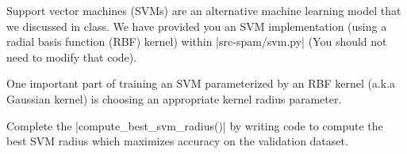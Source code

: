\item {}
Support vector machines (SVMs) are an alternative machine learning model that we discussed in class.
We have provided you an SVM implementation (using a radial basis function (RBF) kernel) within |src-spam/svm.py| (You should not need to modify that code).

One important part of training an SVM parameterized by an RBF kernel (a.k.a Gaussian kernel) is choosing an appropriate kernel radius parameter.

Complete the |compute_best_svm_radius()| by writing code to compute the best SVM radius which maximizes accuracy on the validation dataset.
